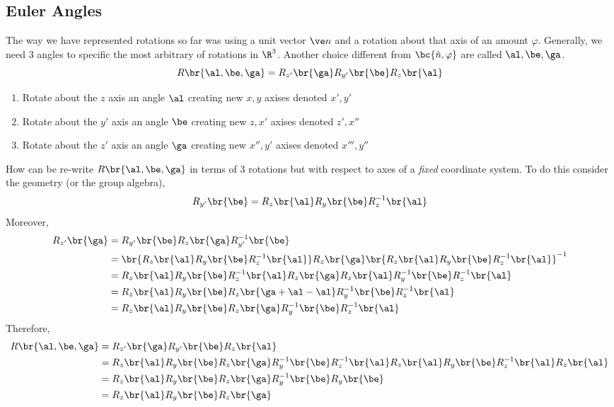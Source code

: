 \documentclass{article}
\begin{document}
\subsection{Euler Angles}
The way we have represented rotations so far was using a unit vector $\ve n$ and a rotation about that axis of an amount $\varphi$. Generally, we need $3$ angles to specific the most arbitrary of rotations in $\R^3$. Another choice different from $\bc{\hat n, \varphi}$ are called  $\al, \be, \ga$.
\[ R\br{\al, \be, \ga} = R_{z'}\br{\ga}R_{y'}\br{\be}R_{z}\br{\al} \]
\begin{enumerate}
    \item Rotate about the $z$ axis an angle $\al$ creating new $x,y$ axises denoted $x', y'$
    \item Rotate about the $y'$ axis an angle $\be$ creating new $z, x'$ axises denoted $z', x''$
    \item Rotate about the $z'$ axis an angle $\ga$ creating new $x'', y'$ axises denoted $x''', y''$
\end{enumerate}
How can be re-write $R\br{\al, \be, \ga}$ in terms of $3$ rotations but with respect to axes of a \textit{fixed} coordinate system. To do this consider the geometry (or the group algebra),
\[ R_{y'}\br{\be} = R_{z}\br{\al}R_{y}\br{\be}R^{-1}_{z}\br{\al} \]
Moreover,
\begin{align*}
R_{z'}\br{\ga}
&= R_{y'}\br{\be} R_{z}\br{\ga} R^{-1}_{y'}\br{\be} \\
&= \br{R_z\br{\al}R_{y}\br{\be}R^{-1}_{z}\br{\al}} R_{z}\br{\ga} \br{R_{z}\br{\al}R_{y}\br{\be}R^{-1}_{z}\br{\al}}^{-1} \\
&= R_z\br{\al}R_{y}\br{\be}R^{-1}_{z}\br{\al} R_{z}\br{\ga} R_{z}\br{\al}R^{-1}_{y}\br{\be}R^{-1}_{z}\br{\al} \\
&= R_z\br{\al}R_{y}\br{\be}R_{z}\br{\ga + \al - \al}R^{-1}_{y}\br{\be}R^{-1}_{z}\br{\al} \\
&= R_z\br{\al}R_{y}\br{\be}R_{z}\br{\ga}R^{-1}_{y}\br{\be}R^{-1}_{z}\br{\al}
\end{align*}
Therefore,
\begin{align*}
    R\br{\al, \be, \ga}
    &= R_{z'}\br{\ga}R_{y'}\br{\be}R_{z}\br{\al}\\
    &= R_z\br{\al}R_{y}\br{\be}R_{z}\br{\ga}R^{-1}_{y}\br{\be}R^{-1}_{z}\br{\al}R_{z}\br{\al}R_{y}\br{\be}R^{-1}_{z}\br{\al}R_{z}\br{\al}\\
    &= R_z\br{\al}R_{y}\br{\be}R_{z}\br{\ga}R^{-1}_{y}\br{\be}R_{y}\br{\be}\\
    &= R_z\br{\al}R_{y}\br{\be}R_{z}\br{\ga}
\end{align*}
\end{document}
